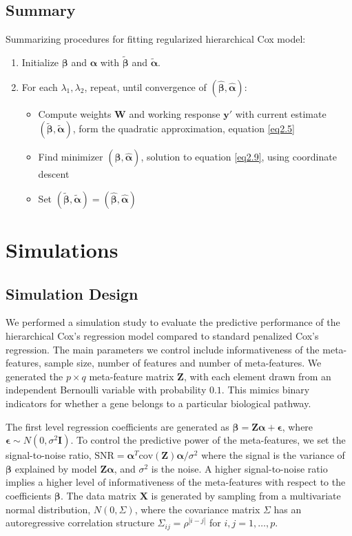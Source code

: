 \subsection{Summary}
Summarizing procedures for fitting regularized hierarchical Cox model: 
\begin{enumerate}
    \item Initialize $\bm{\beta}$ and $\bm{\alpha}$ with $\widetilde{\bm{\beta}}$ and $\widetilde{\bm{\alpha}}$.
    \item For each $\lambda_1, \lambda_2$, repeat, until convergence of $(\hat{\bm{\beta}},\hat{\bm{\alpha}})$: 
    \begin{itemize}
        \item Compute weights $\bm{W}$ and working response $\bm{y}'$ with current estimate $(\widetilde{\bm{\beta}},\widetilde{\bm{\alpha}})$, form the quadratic approximation, equation \eqref{eq2.5}
        \item Find minimizer $(\hat{\bm{\beta}},\hat{\bm{\alpha}})$, solution to equation \eqref{eq2.9}, using coordinate descent
        \item Set $(\widetilde{\bm{\beta}},\widetilde{\bm{\alpha}})=(\hat{\bm{\beta}},\hat{\bm{\alpha}})$
    \end{itemize}
\end{enumerate}

\section{Simulations}
\subsection{Simulation Design}
We performed a simulation study to evaluate the predictive performance of the hierarchical Cox’s regression model compared to standard penalized Cox’s regression. The main parameters we control include informativeness of the meta-features, sample size, number of features and number of meta-features. We generated the $p\times q$ meta-feature matrix $\bm{Z}$, with each element drawn from an independent Bernoulli variable with probability $0.1$. This mimics binary indicators for whether a gene belongs to a particular biological pathway.  

The first level regression coefficients are generated as $\bm{\beta}=\bm{Z\alpha}+\bm{\epsilon}$, where $\bm{\epsilon} \sim N(0, \sigma^2\bm{I})$. To control the predictive power of the meta-features, we set the signal-to-noise ratio, $\text{SNR}=\bm{\alpha}^T\text{cov}(\bm{Z})\bm{\alpha}/\sigma^2$ where the signal is the variance of $\bm{\beta}$ explained by model $\bm{Z\alpha}$, and $\sigma^2$ is the noise. A higher signal-to-noise ratio implies a higher level of informativeness of the meta-features with respect to the coefficients $\bm{\beta}$. The data matrix $\bm{X}$ is generated by sampling from a multivariate normal distribution, $N(0,\Sigma)$, where the covariance matrix $\Sigma$ has an autoregressive correlation structure $\Sigma_{ij}=\rho^{|i-j|}$ for $i,j=1,\dots,p$.

